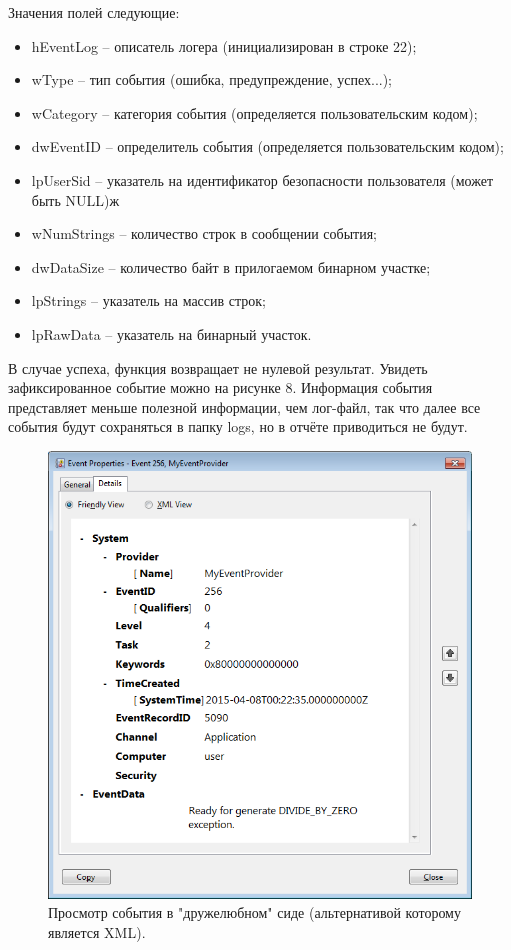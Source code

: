 \documentclass[a4paper, 12pt]{report}		%
\begin{document}
Значения полей следующие:
\begin{itemize}
\item hEventLog -- описатель логера (инициализирован в строке 22);
\item wType -- тип события (ошибка, предупреждение, успех...);
\item wCategory -- категория события (определяется пользовательским кодом);
\item dwEventID -- определитель события (определяется пользовательским кодом);
\item lpUserSid -- указатель на идентификатор безопасности пользователя (может быть NULL)ж
\item wNumStrings -- количество строк в сообщении события;
\item dwDataSize -- количество байт в прилогаемом бинарном участке;
\item lpStrings -- указатель на массив строк;
\item lpRawData -- указатель на бинарный участок.
\end{itemize}

В случае успеха, функция возвращает не нулевой результат. Увидеть зафиксированное событие можно на рисунке 8. Информация события представляет меньше полезной информации, чем лог-файл, так что далее все события будут сохраняться в папку logs, но в отчёте приводиться не будут.

\begin{figure}[h!]
\centering
\includegraphics[scale=0.8]{res/event}
\caption{Просмотр события в "дружелюбном" сиде (альтернативой которому является XML).}
\end{figure}
\end{document}
